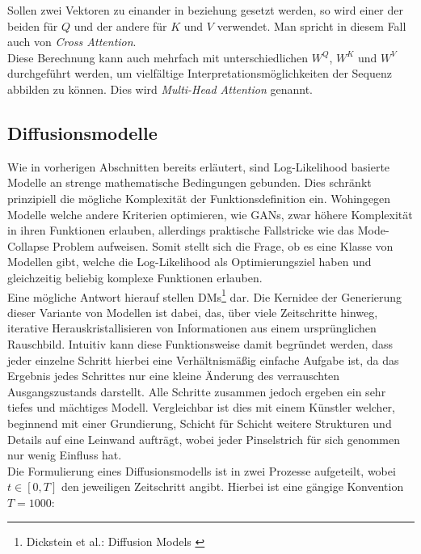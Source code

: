 Sollen zwei Vektoren zu einander in beziehung gesetzt werden, so wird einer der beiden für $Q$ und der andere für $K$ und $V$ verwendet. Man spricht in diesem Fall auch von \textit{Cross Attention}. \\
Diese Berechnung kann auch mehrfach mit unterschiedlichen $W^Q$, $W^K$ und $W^V$ durchgeführt werden, um vielfältige Interpretationsmöglichkeiten der Sequenz abbilden zu können. Dies wird \textit{Multi-Head Attention} genannt.

\subsection{Diffusionsmodelle}
\label{subsec:Grundlagen_DMs}

Wie in vorherigen Abschnitten bereits erläutert, sind Log-Likelihood basierte Modelle an strenge mathematische Bedingungen gebunden. Dies schränkt prinzipiell die mögliche Komplexität der Funktionsdefinition ein. Wohingegen Modelle welche andere Kriterien optimieren, wie \ac{GAN}s, zwar höhere Komplexität in ihren Funktionen erlauben, allerdings praktische Fallstricke wie das Mode-Collapse Problem aufweisen. Somit stellt sich die Frage, ob es eine Klasse von Modellen gibt, welche die Log-Likelihood als Optimierungsziel haben und gleichzeitig beliebig komplexe Funktionen erlauben. \\
Eine mögliche Antwort hierauf stellen \ac{DM}s\footnote{
    Dickstein et al.: Diffusion Models
    \cite{pmlr-v37-sohl-dickstein15}
} dar. Die Kernidee der Generierung dieser Variante von Modellen ist dabei, das, über viele Zeitschritte hinweg, iterative Herauskristallisieren von Informationen aus einem ursprünglichen Rauschbild. Intuitiv kann diese Funktionsweise damit begründet werden, dass jeder einzelne Schritt hierbei eine Verhältnismäßig einfache Aufgabe ist, da das Ergebnis jedes Schrittes nur eine kleine Änderung des verrauschten Ausgangszustands darstellt. Alle Schritte zusammen jedoch ergeben ein sehr tiefes und mächtiges Modell. Vergleichbar ist dies mit einem Künstler welcher, beginnend mit einer Grundierung, Schicht für Schicht weitere Strukturen und Details auf eine Leinwand aufträgt, wobei jeder Pinselstrich für sich genommen nur wenig Einfluss hat. \\
Die Formulierung eines Diffusionsmodells ist in zwei Prozesse aufgeteilt, wobei $t \in [0,T]$ den jeweiligen Zeitschritt angibt. Hierbei ist eine gängige Konvention $T=1000$: 
